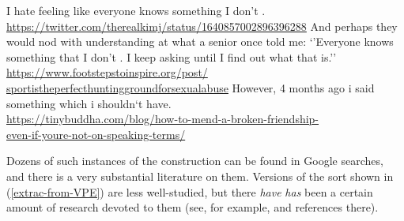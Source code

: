 \documentclass[output=paper,colorlinks,citecolor=brown]{langscibook}
\begin{document}
\begin{exe}
 \ex\label{antecDel}
  \begin{xlist}
 \ex\label{}
    I hate feeling like everyone knows something I don't {\gp}\xspace . \\\url{https://twitter.com/therealkimj/status/1640857002896396288}
 \ex\label{}
    And perhaps they would nod with understanding at what a senior
  once told me: `'Everyone knows something that I don't {\gp}\xspace . I keep
  asking until I find out what that is.''\\
  \url{https://www.footstepstoinspire.org/post/}\\
  \url{sportistheperfecthuntinggroundforsexualabuse}
 \ex\label{}
    However, 4 months ago i said something which i shouldn`t have. \\
    \url{https://tinybuddha.com/blog/how-to-mend-a-broken-friendship-}\\
    \url{even-if-youre-not-on-speaking-terms/}
  \end{xlist}
\end{exe}
Dozens of such instances of the construction can be found in Google
searches, and there is a very substantial literature on them. Versions
of the sort shown in (\ref{extrac-from-VPE}) are less well-studied, but
there \textsl{have} \textsl{has} been a certain amount of research devoted to them (see, for example,
\citet{schuyler2002} and references there).
\end{document}
